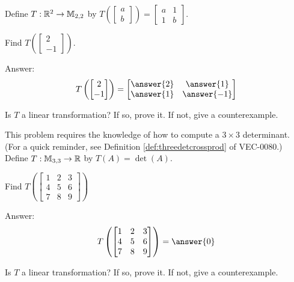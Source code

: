\documentclass{ximera}
\begin{document}
\begin{problem}
Define $T:\mathbb{R}^2\rightarrow\mathbb{M}_{2,2}$ by $T\left(\begin{bmatrix}a\\b\end{bmatrix}\right)=\begin{bmatrix}a&1\\1&b\end{bmatrix}$.

\begin{problem}\label{prob:lintransr2toM22part1}
Find $T\left(\begin{bmatrix}2\\-1\end{bmatrix}\right)$.

Answer: $$T\left(\begin{bmatrix}2\\-1\end{bmatrix}\right)=\begin{bmatrix}\answer{2}&\answer{1}\\\answer{1}&\answer{-1}\end{bmatrix}$$
\end{problem}
\begin{problem}\label{prob:lintransr2toM22part2}
Is $T$ a linear transformation?  If so, prove it.  If not, give a counterexample.
\end{problem}
\end{problem}

\begin{problem}  This problem requires the knowledge of how to compute a $3\times 3$ determinant. (For a quick reminder, see Definition \ref{def:threedetcrossprod} of VEC-0080.)
Define $T:\mathbb{M}_{3,3}\rightarrow \mathbb{R}$ by $T(A)=\det(A)$.  

\begin{problem}\label{prob:detlintrans1}
Find $T\left(\begin{bmatrix}1&2&3\\4&5&6\\7&8&9\end{bmatrix}\right)$

Answer: $$T\left(\begin{bmatrix}1&2&3\\4&5&6\\7&8&9\end{bmatrix}\right)=\answer{0}$$
\end{problem}

\begin{problem}\label{prob:detlintrans2}
Is $T$ a linear transformation?  If so, prove it.  If not, give a counterexample.
\end{problem}
\end{problem}
\end{document}
